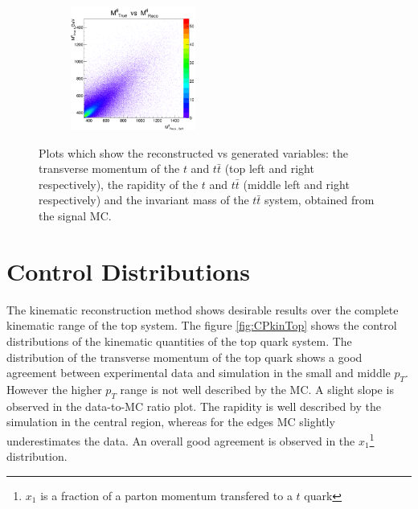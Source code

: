 \begin{figure}[t]
\begin{subfigure}
\end{subfigure}
\begin{subfigure}
  \centering
  \includegraphics[width=0.45\textwidth]{05_kinReco/plots/scatter/mtt-scaterPlot.png}
\end{subfigure}
\caption{Plots which show the reconstructed vs generated variables: the transverse momentum of the $t$ and $t\bar{t}$ (top left and right respectively), 
        the rapidity of the $t$ and $t\bar{t}$ (middle left and right respectively) and the invariant mass of the $t\bar{t}$ system, obtained from the 
        signal MC.}
\label{fig:ScatterPl}
\end{figure}

\section{Control Distributions}

The kinematic reconstruction method shows desirable results over the complete kinematic range of the top system. The figure \ref{fig:CPkinTop} shows
the control distributions of the kinematic quantities of the top quark system. The distribution of the transverse momentum of the top quark
shows a good agreement between experimental data and simulation in the small and middle $p_{T}$. However the higher $p_{T}$ range is not well
described by the MC. A slight slope is observed in the data-to-MC ratio plot. The rapidity is well described by the simulation in the central region, 
whereas for the edges MC slightly underestimates the data.
An overall good agreement is observed in the  $x_{1}$\footnote{ $x_{1}$ is a fraction of a parton momentum transfered to a $t$ quark} 
distribution.

